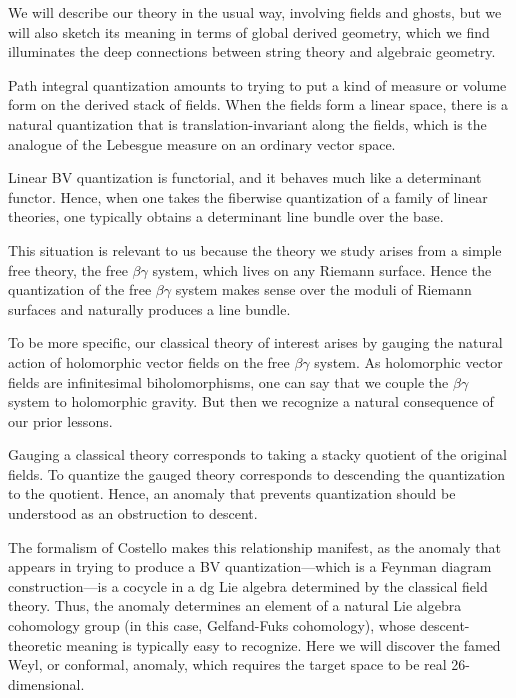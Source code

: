 We will describe our theory in the usual way, involving fields and ghosts, 
but we will also sketch its meaning in terms of global derived geometry,
which we find illuminates the deep connections between string theory and algebraic geometry.

Path integral quantization amounts to trying to put a kind of measure or volume form on the derived stack of fields.
When the fields form a linear space, 
there is a natural quantization that is translation-invariant along the fields,
which is the analogue of the Lebesgue measure on an ordinary vector space.

\begin{lesson}[\cite{GH}]
Linear BV quantization is functorial, and it behaves much like a determinant functor.
Hence, when one takes the fiberwise quantization of a family of linear theories,
one typically obtains a determinant line bundle over the base.
\end{lesson}

This situation is relevant to us because the theory we study arises from a simple free theory,
the free $\beta\gamma$ system, which lives on any Riemann surface.
Hence the quantization of the free $\beta\gamma$ system makes sense over the moduli of Riemann surfaces and naturally produces a line bundle.

To be more specific, our classical theory of interest arises by gauging the natural action of holomorphic vector fields on the free $\beta\gamma$ system.
As holomorphic vector fields are infinitesimal biholomorphisms, 
one can say that we couple the $\beta\gamma$ system to holomorphic gravity.
But then we recognize a natural consequence of our prior lessons.

\begin{lesson}
Gauging a classical theory corresponds to taking a stacky quotient of the original fields. 
To quantize the gauged theory corresponds to descending the quantization to the quotient.
Hence, an anomaly that prevents quantization should be understood as an obstruction to descent.
\end{lesson}

The formalism of Costello makes this relationship manifest, 
as the anomaly that appears in trying to produce a BV quantization---which is a Feynman diagram construction---is a cocycle in a dg Lie algebra determined by the classical field theory.
Thus, the anomaly determines an element of a natural Lie algebra cohomology group (in this case, Gelfand-Fuks cohomology),
whose descent-theoretic meaning is typically easy to recognize. 
Here we will discover the famed Weyl, or conformal, anomaly, which requires the target space to be real 26-dimensional. 

